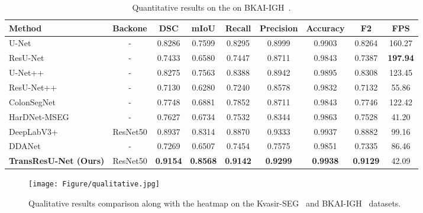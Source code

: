\documentclass[conference]{IEEEtran}
\begin{document}
\begin{table*}[t!]
\centering
\caption{Quantitative results on the on BKAI-IGH~\cite{lan2021neounet}.}
 \begin{tabular} {@{}l|c|c|c|c|c|c|c|c@{}}
\toprule
\textbf{Method} & \textbf{Backone} &\textbf{DSC} & \textbf{mIoU} &\textbf{Recall}  &\textbf{Precision}& \textbf{Accuracy} &\textbf{F2} &\textbf{FPS}\\ 
\hline
U-Net~\cite{ronneberger2015u} &-	&0.8286	&0.7599	&0.8295	&0.8999	&0.9903	&0.8264	&160.27\\
ResU-Net~\cite{zhang2018road}&-	&0.7433	&0.6580	&0.7447	&0.8711	&0.9843	&0.7387	&\textbf{197.94}\\
U-Net++~\cite{zhou2018unet++}&-&0.8275	&0.7563	&0.8388	&0.8942	&0.9895	&0.8308	&123.45\\
ResU-Net++~\cite{jha2019resunet++}&- &0.7130	&0.6280	&0.7240	&0.8578	&0.9832	&0.7132	&55.86\\
ColonSegNet~\cite{jha2021real}	&-&0.7748	&0.6881	&0.7852	&0.8711	&0.9843	&0.7746	&122.42\\
HarDNet-MSEG~\cite{huang2021hardnet}&-&0.7627	&0.6734	&0.7532	&0.8344	&0.9863	&0.7528	&41.20\\
DeepLabV3+\cite{chen2018encoder}&ResNet50 &0.8937	&0.8314	&0.8870	&0.9333	&0.9937	&0.8882	&99.16\\
DDANet~\cite{tomar2021ddanet}	&- &0.7269	&0.6507	&0.7454	&0.7575	&0.9851	&0.7335	&86.46\\
\textbf{TransResU-Net (Ours)}	& ResNet50  &\textbf{0.9154} &\textbf{0.8568} &\textbf{0.9142} &\textbf{0.9299} &\textbf{0.9938} &\textbf{0.9129} & 42.09 \\
\hline
\end{tabular}
\label{tab:results-bkai}
\end{table*}

\begin{figure*}[t!]
    \centering
    \texttt{[image: Figure/qualitative.jpg]}
    \caption{Qualitative results comparison along with the heatmap on the Kvasir-SEG~\cite{jha2020kvasir} and BKAI-IGH~\cite{lan2021neounet} datasets.}
    \label{fig:results}
\end{figure*}
\end{document}
